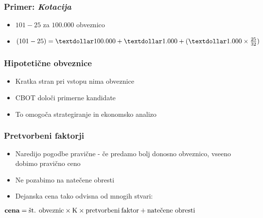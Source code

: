 \documentclass[14pt]{beamer}
\begin{document}
\begin{frame}
    \frametitle{Primer: \textit{Kotacija}}
    
    \begin{itemize}
        \item $101-25$ za \textdollar$100.000$ obveznico
        \item $ (101-25) = 
            \textdollar100.000 + \textdollar1.000 + (\textdollar1.000 \times \frac{25}{32}) $
    \end{itemize}

    \note[item]{}

\end{frame}


\begin{frame}
    \frametitle{Hipotetične obveznice}
    
    \begin{itemize}
        \item Kratka stran pri vstopu nima obveznice
        \item CBOT določi primerne kandidate
        \item To omogoča strategiranje in ekonomsko analizo
    \end{itemize}


\end{frame}


\begin{frame}
    \frametitle{Pretvorbeni faktorji}
    
    \begin{itemize}
        \item Naredijo pogodbe pravične - če predamo bolj donosno
                obveznico, vseeno dobimo pravično ceno
        \item Ne pozabimo na natečene obresti 
        \item Dejanska cena tako odvisna od mnogih stvari:
    \end{itemize}
    \textit{$ \textbf{cena} = \text{št. obveznic} \times \text{K} \times \text{pretvorbeni\:faktor} 
        + \text{natečene obresti} $}


\end{frame}
\end{document}
